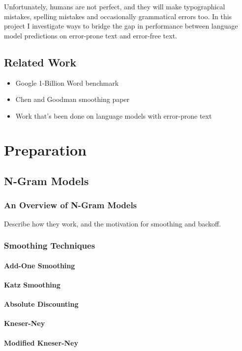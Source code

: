 \documentclass[a4paper, 12pt]{report}
\begin{document}
Unfortunately, humans are not perfect, and they will make typographical mistakes, spelling mistakes and occasionally grammatical errors too. In this project I investigate ways to bridge the gap in performance between language model predictions on error-prone text and error-free text. 

\section{Related Work}
\begin{itemize}
\item
	Google 1-Billion Word benchmark
\item
	Chen and Goodman smoothing paper
\item
	Work that's been done on language models with error-prone text 
\end{itemize}

\chapter{Preparation}
\section{N-Gram Models}
\subsection{An Overview of N-Gram Models}
Describe how they work, and the motivation for smoothing and backoff.
\subsection{Smoothing Techniques}
\subsubsection{Add-One Smoothing}
\subsubsection{Katz Smoothing}
\subsubsection{Absolute Discounting}
\subsubsection{Kneser-Ney}
\subsubsection{Modified Kneser-Ney}
\end{document}
